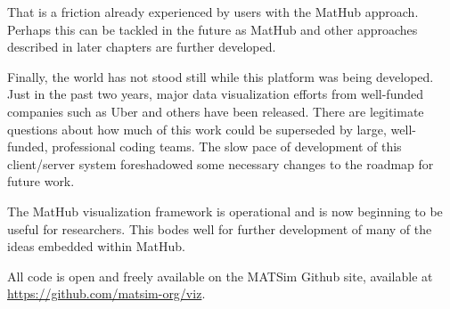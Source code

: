 That is a friction already experienced by users with the MatHub approach. Perhaps this can be tackled in the future as MatHub and other approaches described in later chapters are further developed.

Finally, the world has not stood still while this platform was being developed. Just in the past two years, major data visualization efforts from well-funded companies such as Uber and others have been released. There are legitimate questions about how much of this work could be superseded by large, well-funded, professional coding teams. The slow pace of development of this client/server system foreshadowed some necessary changes to the roadmap for future work.

The MatHub visualization framework is operational and is now beginning to be useful for researchers. This bodes well for further development of many of the ideas embedded within MatHub.

All code is open and freely available on the MATSim Github site, available at \url{https://github.com/matsim-org/viz}.
